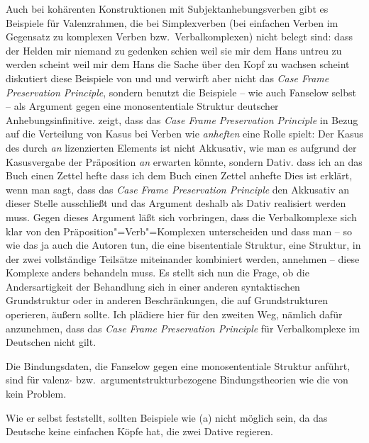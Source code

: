 {        Auch bei kohärenten Konstruktionen mit Subjektanhebungsverben gibt es Beispiele für Valenzrahmen,
        die bei Simplexverben (\dash bei einfachen Verben im Gegensatz zu komplexen Verben
        bzw.\ Verbalkomplexen) nicht belegt sind:
        \eal
        \ex dass der Helden mir niemand zu gedenken schien
        \ex weil sie mir dem Hans untreu zu werden scheint
        \ex weil mir dem Hans die Sache über den Kopf zu wachsen scheint
        \zl
        \citet[]{Grewendorf94a} diskutiert diese Beispiele von \citet[]{Olsen81a}
        und \citet{Fanselow89b} und verwirft aber nicht das \emph{Case Frame Preservation Principle},
        sondern benutzt die Beispiele -- wie auch Fanselow selbst -- als Argument gegen eine monosententiale Struktur
        deutscher Anhebungsinfinitive. \citet[]{Fanselow89b} zeigt, dass
        das \emph{Case Frame Preservation Principle} in Bezug auf die Verteilung von Kasus
        bei Verben wie \emph{anheften} eine Rolle spielt: Der Kasus
        des durch \emph{an} lizenzierten Elements ist nicht Akkusativ, wie man es aufgrund
        der Kasusvergabe der Präposition \emph{an} erwarten könnte, sondern Dativ.
        \eal
        \ex dass ich an das Buch einen Zettel hefte
        \ex dass ich dem Buch einen Zettel anhefte
        \zl
        Dies ist erklärt, wenn man sagt, dass das \emph{Case Frame Preservation Principle}
        den Akkusativ an dieser Stelle ausschließt und das Argument deshalb als Dativ
        realisiert werden muss. Gegen dieses Argument läßt sich vorbringen, dass die Verbalkomplexe
        sich klar von den Präposition"=Verb"=Komplexen unterscheiden und dass man -- so wie
        das ja auch die Autoren tun, die eine bisententiale Struktur, \dash eine Struktur, in der zwei
        vollständige Teilsätze miteinander kombiniert werden, annehmen -- diese
        Komplexe anders behandeln muss. Es stellt sich nun die Frage, ob die Andersartigkeit 
        der Behandlung sich in einer anderen syntaktischen Grundstruktur oder in anderen
        Beschränkungen, die auf Grundstrukturen operieren, äußern sollte. Ich plädiere
        hier für den zweiten Weg, nämlich dafür anzunehmen, dass das \emph{Case Frame Preservation Principle}
        für Verbalkomplexe im Deutschen nicht gilt.

        Die Bindungsdaten, die Fanselow gegen eine monosententiale Struktur anführt,
        sind für valenz- bzw.\ argumentstrukturbezogene Bindungstheorien wie die von 
        kein Problem.
}
Wie er selbst feststellt, sollten Beispiele wie (a) nicht möglich sein,
da das Deutsche keine einfachen Köpfe hat, die zwei Dative regieren.

